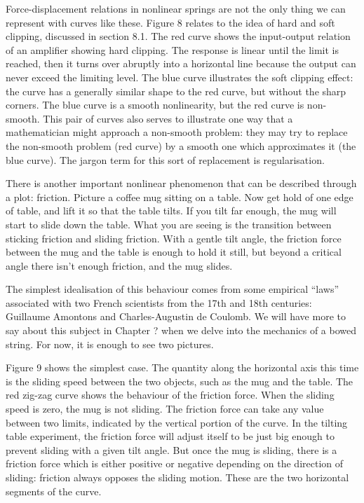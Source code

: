   Force-displacement relations in nonlinear springs are not the only thing we 
  can represent with curves like these. Figure 8 relates to the idea of hard 
  and soft clipping, discussed in section 8.1. The red curve shows the 
  input-output relation of an amplifier showing hard clipping. The response is 
  linear until the limit is reached, then it turns over abruptly into a 
  horizontal line because the output can never exceed the limiting level. The 
  blue curve illustrates the soft clipping effect: the curve has a generally 
  similar shape to the red curve, but without the sharp corners. The blue curve 
  is a smooth nonlinearity, but the red curve is non-smooth. This pair of 
  curves also serves to illustrate one way that a mathematician might approach 
  a non-smooth problem: they may try to replace the non-smooth problem (red 
  curve) by a smooth one which approximates it (the blue curve). The jargon 
  term for this sort of replacement is regularisation. 


  There is another important nonlinear phenomenon that can be described through 
  a plot: friction. Picture a coffee mug sitting on a table. Now get hold of 
  one edge of table, and lift it so that the table tilts. If you tilt far 
  enough, the mug will start to slide down the table. What you are seeing is 
  the transition between sticking friction and sliding friction. With a gentle 
  tilt angle, the friction force between the mug and the table is enough to 
  hold it still, but beyond a critical angle there isn’t enough friction, and 
  the mug slides. 

  The simplest idealisation of this behaviour comes from some empirical “laws” 
  associated with two French scientists from the 17th and 18th centuries: 
  Guillaume Amontons and Charles-Augustin de Coulomb. We will have more to say 
  about this subject in Chapter ? when we delve into the mechanics of a bowed 
  string. For now, it is enough to see two pictures. 

  Figure 9 shows the simplest case. The quantity along the horizontal axis this 
  time is the sliding speed between the two objects, such as the mug and the 
  table. The red zig-zag curve shows the behaviour of the friction force. When 
  the sliding speed is zero, the mug is not sliding. The friction force can 
  take any value between two limits, indicated by the vertical portion of the 
  curve. In the tilting table experiment, the friction force will adjust itself 
  to be just big enough to prevent sliding with a given tilt angle. But once 
  the mug is sliding, there is a friction force which is either positive or 
  negative depending on the direction of sliding: friction always opposes the 
  sliding motion. These are the two horizontal segments of the curve. 


